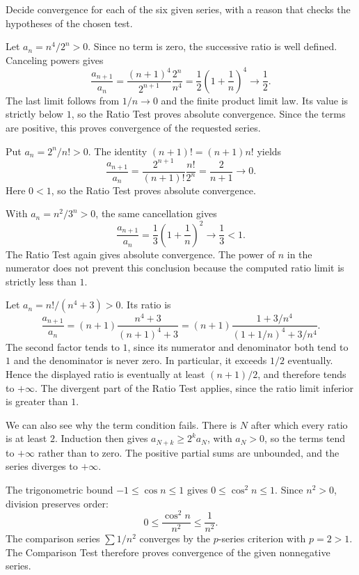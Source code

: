 \goal Decide convergence for each of the six given series, with a
reason that checks the hypotheses of the chosen test.

Let $a_n=n^4/2^n>0$. Since no term is zero, the successive ratio is
well defined. Canceling powers gives
\[
 \frac{a_{n+1}}{a_n}
 =\frac{(n+1)^4}{2^{n+1}}\frac{2^n}{n^4}
 =\frac12\left(1+\frac1n\right)^4
 \longrightarrow\frac12.
\]
The last limit follows from $1/n\to0$ and the finite product limit
law. Its value is strictly below $1$, so the Ratio Test proves
absolute convergence. Since the terms are positive, this proves
convergence of the requested series.

Put $a_n=2^n/n!>0$. The identity $(n+1)!=(n+1)n!$ yields
\[
 \frac{a_{n+1}}{a_n}
 =\frac{2^{n+1}}{(n+1)!}\frac{n!}{2^n}
 =\frac{2}{n+1}\longrightarrow0.
\]
Here $0<1$, so the Ratio Test proves absolute convergence.

With $a_n=n^2/3^n>0$, the same cancellation gives
\[
 \frac{a_{n+1}}{a_n}
 =\frac13\left(1+\frac1n\right)^2\longrightarrow\frac13<1.
\]
The Ratio Test again gives absolute convergence. The power of $n$
in the numerator does not prevent this conclusion because the
computed ratio limit is strictly less than $1$.

Let $a_n=n!/(n^4+3)>0$. Its ratio is
\[
 \frac{a_{n+1}}{a_n}
 =(n+1)\frac{n^4+3}{(n+1)^4+3}
 =(n+1)\frac{1+3/n^4}{(1+1/n)^4+3/n^4}.
\]
The second factor tends to $1$, since its numerator and denominator
both tend to $1$ and the denominator is never zero. In particular,
it exceeds $1/2$ eventually. Hence the displayed ratio is eventually
at least $(n+1)/2$, and therefore tends to $+\infty$.
The divergent part of the Ratio Test applies, since the ratio
limit inferior is greater than $1$.

We can also see why the term condition fails. There is $N$ after
which every ratio is at least $2$. Induction then gives
$a_{N+k}\ge2^k a_N$, with $a_N>0$, so the terms tend to
$+\infty$ rather than to zero. The positive partial sums are
unbounded, and the series diverges to $+\infty$.

The trigonometric bound $-1\le\cos n\le1$ gives
$0\le\cos^2 n\le1$. Since $n^2>0$, division preserves order:
\[
 0\le\frac{\cos^2 n}{n^2}\le\frac1{n^2}.
\]
The comparison series $\sum 1/n^2$ converges by the $p$-series
criterion with $p=2>1$. The Comparison Test therefore proves
convergence of the given nonnegative series.

